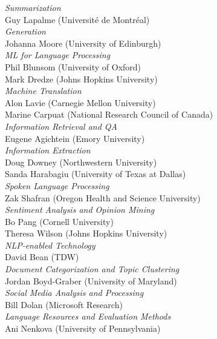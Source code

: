\emph{Summarization} \\
Guy Lapalme (Université de Montréal) \\

\emph{Generation} \\
Johanna Moore (University of Edinburgh) \\

\emph{ML for Language Processing} \\
Phil Blunsom (University of Oxford) \\
Mark Dredze (Johns Hopkins University) \\

\emph{Machine Translation} \\
Alon Lavie (Carnegie Mellon University) \\
Marine Carpuat (National Research Council of Canada) \\

\emph{Information Retrieval and QA} \\
Eugene Agichtein (Emory University) \\

\emph{Information Extraction} \\
Doug Downey (Northwestern University) \\
Sanda Harabagiu (University of Texas at Dallas) \\

\emph{Spoken Language Processing} \\
Zak Shafran (Oregon Health and Science University) \\

\emph{Sentiment Analysis and Opinion Mining} \\
Bo Pang (Cornell University) \\
Theresa Wilson (Johns Hopkins University) \\

\emph{NLP-enabled Technology} \\
David Bean (TDW) \\

\emph{Document Categorization and Topic Clustering} \\
Jordan Boyd-Graber (University of Maryland) \\

\emph{Social Media Analysis and Processing} \\
Bill Dolan (Microsoft Research) \\

\emph{Language Resources and Evaluation Methods} \\
Ani Nenkova (University of Pennsylvania)

